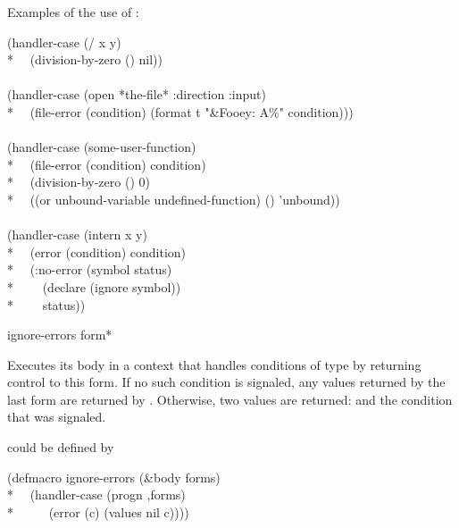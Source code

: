 \begin{defmac}
Examples of the use of :
\begin{lisp}
(handler-case (/ x y) \\*
~~(division-by-zero () nil)) \\
 \\
(handler-case (open *the-file* :direction :input) \\*
~~(file-error (condition) (format t "{\Xtilde}\&Fooey: {\Xtilde}A{\Xtilde}\%" condition))) \\
 \\
(handler-case (some-user-function) \\*
~~(file-error (condition) condition) \\*
~~(division-by-zero () 0) \\*
~~((or unbound-variable undefined-function) () 'unbound)) \\
 \\
(handler-case (intern x y) \\*
~~(error (condition) condition) \\*
~~(:no-error (symbol status) \\*
~~~~(declare (ignore symbol)) \\*
~~~~status))
\end{lisp}
\end{defmac}

\begin{defmac}
ignore-errors {form}*

Executes its body in a context that handles conditions of type  by
returning control to this form. If no such condition is signaled, any values
returned by the last form are returned by . Otherwise, two
values are returned:  and the  condition that was signaled.

 could be defined by
\begin{lisp}
(defmacro ignore-errors (\&body forms) \\*
~~{\Xbq}(handler-case (progn ,{\Xatsign}forms) \\*
~~~~~(error (c) (values nil c))))
\end{lisp}
\end{defmac}


